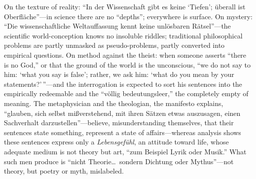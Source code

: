 On the texture of reality: ``In der Wissenschaft gibt es keine `Tiefen'; \"uberall ist Oberfl\"ache''---in science there are no ``depths''; everywhere is surface. On mystery: ``Die wissenschaftliche Weltauffassung kennt keine unl\"osbaren R\"atsel''---the scientific world-conception knows no insoluble riddles; traditional philosophical problems are partly unmasked as pseudo-problems, partly converted into empirical questions. On method against the theist: when someone asserts ``there is no God,'' or that the ground of the world is the unconscious, ``we do not say to him: `what you say is false'; rather, we ask him: `what do you mean by your statements?'\,''---and the interrogation is expected to sort his sentences into the empirically redeemable and the ``v\"ollig bedeutungsleer,'' the completely empty of meaning. The metaphysician and the theologian, the manifesto explains, ``glauben, sich selbst mi{\ss}verstehend, mit ihren S\"atzen etwas auszusagen, einen Sachverhalt darzustellen''---believe, misunderstanding themselves, that their sentences state something, represent a state of affairs---whereas analysis shows these sentences express only a \emph{Lebensgef\"uhl}, an attitude toward life, whose adequate medium is not theory but art, ``zum Beispiel Lyrik oder Musik.'' What such men produce is ``nicht Theorie\ldots\ sondern Dichtung oder Mythus''---not theory, but poetry or myth, mislabeled.

